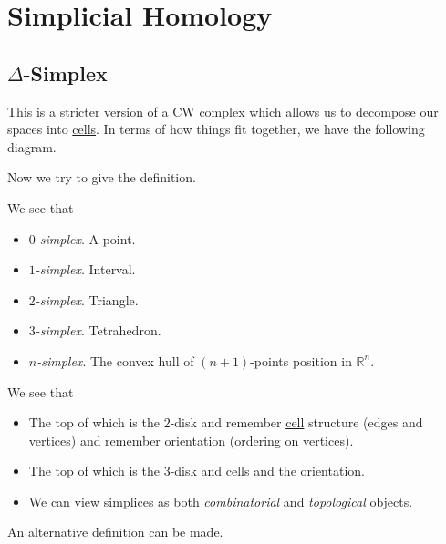 \section{Simplicial Homology}
\subsection{\(\Delta\)-Simplex}
This is a stricter version of a \hyperref[def:CW-Complex]{CW complex} which allows us to decompose our spaces into \hyperref[def:cell]{cells}. In terms of how things fit together, we have the following diagram.
\begin{figure}[H]
	\centering
	\label{fig:simplicial-homology-venn-diagram}
\end{figure}

Now we try to give the definition.
\begin{definition}[Simplex]\label{def:simplex}
	We see that
	\begin{itemize}
		\item \emph{\(0\)-simplex}. A point.
		\item \emph{\(1\)-simplex}. Interval.
		\item \emph{\(2\)-simplex}. Triangle.
		\item \emph{\(3\)-simplex}. Tetrahedron.
		\item \emph{\(n\)-simplex}. The convex hull of \((n+1)\)-points position in \(\mathbb{R} ^n\).
	\end{itemize}
	\begin{figure}[H]
		\centering
		\label{fig:def:simplex}
	\end{figure}
\end{definition}
\begin{remark}
	We see that
	\begin{itemize}
		\item The top of which is the \(2\)-disk and remember \hyperref[def:cell]{cell} structure (edges and vertices) and remember orientation (ordering on vertices).
		\item The top of which is the \(3\)-disk and \hyperref[def:cell]{cells} and the orientation.
		\item We can view \hyperref[def:simplex]{simplices} as both \emph{combinatorial} and \emph{topological} objects.
	\end{itemize}
\end{remark}

An alternative definition can be made.

